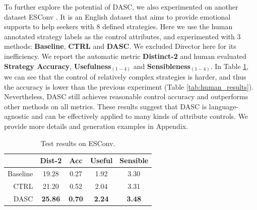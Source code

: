 To further explore the potential of DASC, we also experimented on another dataset ESConv \citep{liu2021towards}. It is an English dataset that aims to provide emotional supports to help seekers with 8 defined strategies. Here we use the human annotated strategy labels as the control attributes, and experimented with 3 methods: \textbf{Baseline}, \textbf{CTRL} and \textbf{DASC}. We excluded Director here for its inefficiency. 
We report the automatic metric \textbf{Distinct-2} and human evaluated \textbf{Strategy Accuracy}, \textbf{Usefulness}$_{(1-4)}$ and \textbf{Sensibleness}$_{(1-4)}$. In Table \ref{tab:esconv_results}, we can see that the control of relatively complex strategies is harder, and thus the accuracy is lower than the previous experiment (Table \ref{tab:human_results}). Nevertheless, DASC still achieves reasonable control accuracy and outperforms other methods on all metrics. These results suggest that DASC is language-agnostic and can be effectively applied to many kinds of attribute controls. We provide more details and generation examples in Appendix.

\begin{table}[th]
    \centering
    \small
    \begin{tabular}{rcccc}
        \hline
             & Dist-2         & Acc           & Useful        & Sensible      \\ \hline
    Baseline & 19.28          & 0.27          & 1.92          & 3.30          \\
    CTRL     & 21.20          & 0.52          & 2.04          & 3.31          \\
    DASC     & \textbf{25.86} & \textbf{0.70} & \textbf{2.24} & \textbf{3.48} \\ \hline
    \end{tabular}
    \caption{Test results on ESConv.}
    \label{tab:esconv_results}
\end{table}

